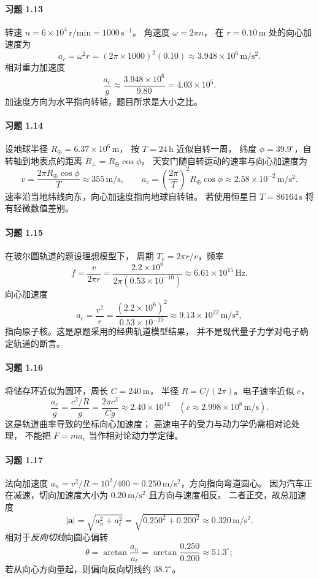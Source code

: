 \paragraph{习题 1.13}
转速 \(n=6\times10^4\,\mathrm{r/min}
=1000\,\mathrm{s^{-1}}\)。
角速度 \(\omega=2\pi n\)，
在 \(r=0.10\,\mathrm m\) 处的向心加速度为
\[
 a_c=\omega^2r=(2\pi\times1000)^2(0.10)
 \approx3.948\times10^6\,\mathrm{m/s^2}.
\]
相对重力加速度
\[
 \frac{a_c}{g}\approx\frac{3.948\times10^6}{9.80}
 =4.03\times10^5.
\]
加速度方向为水平指向转轴，题目所求是大小之比。

\paragraph{习题 1.14}
设地球半径 \(R_\oplus=6.37\times10^6\,\mathrm m\)，
按 \(T=24\,\mathrm h\) 近似自转一周，
纬度 \(\phi=39.9^\circ\)，自转轴到地表点的距离
\(R_\perp=R_\oplus\cos\phi\)。
天安门随自转运动的速率与向心加速度为
\[
 v=\frac{2\pi R_\oplus\cos\phi}{T}
 \approx355\,\mathrm{m/s},\qquad
 a_c=\left(\frac{2\pi}{T}\right)^2R_\oplus\cos\phi
 \approx2.58\times10^{-2}\,\mathrm{m/s^2}.
\]
速率沿当地纬线向东，向心加速度指向地球自转轴。
若使用恒星日 \(T=86164\,\mathrm s\) 将有轻微数值差别。

\paragraph{习题 1.15}
在玻尔圆轨道的题设理想模型下，
周期 \(T_e=2\pi r/v\)，频率
\[
 f=\frac{v}{2\pi r}
 =\frac{2.2\times10^6}{2\pi(0.53\times10^{-10})}
 \approx6.61\times10^{15}\,\mathrm{Hz}.
\]
向心加速度
\[
 a_c=\frac{v^2}{r}
 =\frac{(2.2\times10^6)^2}{0.53\times10^{-10}}
 \approx9.13\times10^{22}\,\mathrm{m/s^2},
\]
指向原子核。这是原题采用的经典轨道模型结果，
并不是现代量子力学对电子确定轨道的断言。

\paragraph{习题 1.16}
将储存环近似为圆环，周长 \(C=240\,\mathrm m\)，
半径 \(R=C/(2\pi)\)。电子速率近似 \(c\)，
\[
 \frac{a_c}{g}=
 \frac{c^2/R}{g}
 =\frac{2\pi c^2}{Cg}
 \approx2.40\times10^{14}
 \quad
 (c\approx2.998\times10^8\,\mathrm{m/s}).
\]
这是轨道曲率导致的坐标向心加速度；
高速电子的受力与动力学仍需相对论处理，
不能把 \(F=ma_c\) 当作相对论动力学定律。

\paragraph{习题 1.17}
法向加速度 \(a_n=v^2/R=10^2/400
=0.250\,\mathrm{m/s^2}\)，方向指向弯道圆心。
因为汽车正在减速，切向加速度大小为
\(0.20\,\mathrm{m/s^2}\) 且方向与速度相反。
二者正交，故总加速度
\[
 |\boldsymbol a|=\sqrt{a_n^2+a_t^2}
 =\sqrt{0.250^2+0.200^2}
 \approx0.320\,\mathrm{m/s^2}.
\]
相对于\emph{反向切线}向圆心偏转
\[
 \theta=\arctan\frac{a_n}{a_t}
 =\arctan\frac{0.250}{0.200}
 \approx51.3^\circ;
\]
若从向心方向量起，则偏向反向切线约
\(38.7^\circ\)。

